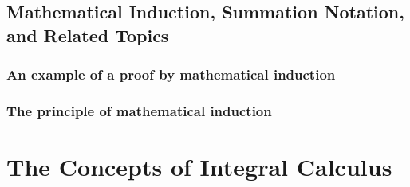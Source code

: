 \documentclass[cn,11pt,chinese]{elegantbook}
\numberwithin{equation}{section}
\begin{document}
\section{Mathematical Induction, Summation Notation, and Related Topics}\label{section00104}

\subsection{An example of a proof by mathematical induction}\label{section0010401}



\subsection{The principle of mathematical induction}\label{section0010402}


\chapter{The Concepts of Integral Calculus}\label{chapter002}








% 

\appendix
\end{document}
